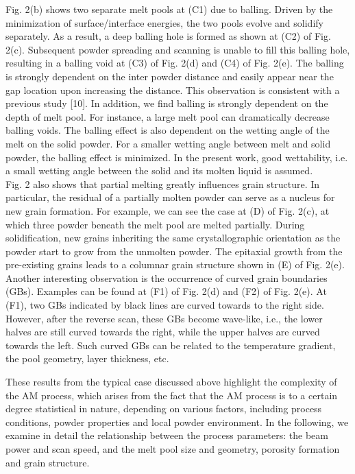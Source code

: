 \documentclass[10pt]{article}
\begin{document}
Fig. 2(b) shows two separate melt pools at (C1) due to balling. Driven by the minimization of surface/interface energies, the two pools evolve and solidify separately. As a result, a deep balling hole is formed as shown at (C2) of Fig. 2(c). Subsequent powder spreading and scanning is unable to fill this balling hole, resulting in a balling void at (C3) of Fig. 2(d) and (C4) of Fig. 2(e). The balling is strongly dependent on the inter powder distance and easily appear near the gap location upon increasing the distance. This observation is consistent with a previous study [10]. In addition, we find balling is strongly dependent on the depth of melt pool. For instance, a large melt pool can dramatically decrease balling voids. The balling effect is also dependent on the wetting angle of the melt on the solid powder. For a smaller wetting angle between melt and solid powder, the balling effect is minimized. In the present work, good wettability, i.e. a small wetting angle between the solid and its molten liquid is assumed.\\
Fig. 2 also shows that partial melting greatly influences grain structure. In particular, the residual of a partially molten powder can serve as a nucleus for new grain formation. For example, we can see the case at (D) of Fig. 2(c), at which three powder beneath the melt pool are melted partially. During solidification, new grains inheriting the same crystallographic orientation as the powder start to grow from the unmolten powder. The epitaxial growth from the pre-existing grains leads to a columnar grain structure shown in (E) of Fig. 2(e). Another interesting observation is the occurrence of curved grain boundaries (GBs). Examples can be found at (F1) of Fig. 2(d) and (F2) of Fig. 2(e). At (F1), two GBs indicated by black lines are curved towards to the right side. However, after the reverse scan, these GBs become wave-like, i.e., the lower halves are still curved towards the right, while the upper halves are curved towards the left. Such curved GBs can be related to the temperature gradient, the pool geometry, layer thickness, etc.

These results from the typical case discussed above highlight the complexity of the AM process, which arises from the fact that the AM process is to a certain degree statistical in nature, depending on various factors, including process conditions, powder properties and local powder environment. In the following, we examine in detail the relationship between the process parameters: the beam power and scan speed, and the melt pool size and geometry, porosity formation and grain structure.
\end{document}
